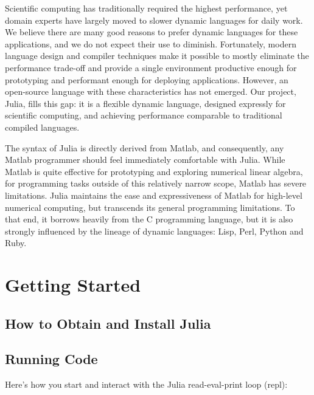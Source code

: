 \documentclass{article}
\title{\thetitle}
\author{
Jeff Bezanson \vspace{0.5em}\\
Stefan Karpinski \vspace{0.5em}\\
Viral Shah \vspace{0.5em}
}
\renewcommand{\sec}[1]{\label{sec:#1}}
\begin{document}
\maketitle

Scientific computing has traditionally required the highest performance, yet domain experts have largely moved to slower dynamic languages for daily work.
We believe there are many good reasons to prefer dynamic languages for these applications, and we do not expect their use to diminish.
Fortunately, modern language design and compiler techniques make it possible to mostly eliminate the performance trade-off and provide a single environment productive enough for prototyping and performant enough for deploying applications.
However, an open-source language with these characteristics has not emerged.
Our project, Julia, fills this gap:
it is a flexible dynamic language, designed expressly for scientific computing, and achieving performance comparable to traditional compiled languages.

The syntax of Julia is directly derived from Matlab, and consequently, any Matlab programmer should feel immediately comfortable with Julia.
While Matlab is quite effective for prototyping and exploring numerical linear algebra, for programming tasks outside of this relatively narrow scope, Matlab has severe limitations.
Julia maintains the ease and expressiveness of Matlab for high-level numerical computing, but transcends its general programming limitations.
To that end, it borrows heavily from the C programming language, but it is also strongly influenced by the lineage of dynamic languages:
Lisp, Perl, Python and Ruby.

\section{Getting Started}
\sec{getting-started}

\subsection{How to Obtain and Install Julia}
\sec{obtaining-and-installing}

\subsection{Running Code}
\sec{running-code}

Here's how you start and interact with the Julia read-eval-print loop (repl):
\end{document}
